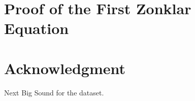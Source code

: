 \documentclass[conference]{IEEEtran}
\begin{document}
{\appendices
\section{Proof of the First Zonklar Equation}
\blindtext

\section*{Acknowledgment}

Next Big Sound for the dataset.


\ifCLASSOPTIONcaptionsoff
  \newpage
\fi





%
%
%
\begin{thebibliography}{1}


\end{thebibliography}}
\end{document}
